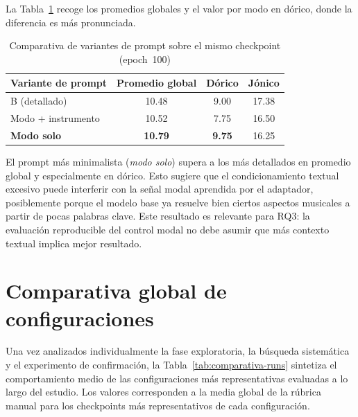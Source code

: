 \documentclass[%
    school=etsisi,%
    type=pfg,%
    degree=61CD,%
]{upm-report}
\begin{document}
La Tabla~\ref{tab:ablacion-prompts} recoge los promedios globales y el valor por modo en d\'orico, donde la diferencia es m\'as pronunciada.

\begin{table}[htbp]
    \centering
    \caption{Comparativa de variantes de prompt sobre el mismo checkpoint (epoch~100)}
    \label{tab:ablacion-prompts}
    \begin{tabular}{lccc}
        \toprule
        \textbf{Variante de prompt} & \textbf{Promedio global} & \textbf{D\'orico} & \textbf{J\'onico} \\
        \midrule
        B (detallado)         & 10.48 & 9.00  & 17.38 \\
        Modo + instrumento    & 10.52 & 7.75  & 16.50 \\
        \textbf{Modo solo}    & \textbf{10.79} & \textbf{9.75} & 16.25 \\
        \bottomrule
    \end{tabular}
\end{table}

El prompt m\'as minimalista (\textit{modo solo}) supera a los m\'as detallados en promedio global y especialmente en d\'orico. Esto sugiere que el condicionamiento textual excesivo puede interferir con la se\~nal modal aprendida por el adaptador, posiblemente porque el modelo base ya resuelve bien ciertos aspectos musicales a partir de pocas palabras clave. Este resultado es relevante para RQ3: la evaluaci\'on reproducible del control modal no debe asumir que m\'as contexto textual implica mejor resultado.

\section{Comparativa global de configuraciones}
\label{s:comparativa-global}

Una vez analizados individualmente la fase exploratoria, la b\'usqueda sistem\'atica y el experimento de confirmaci\'on, la Tabla~\ref{tab:comparativa-runs} sintetiza el comportamiento medio de las configuraciones m\'as representativas evaluadas a lo largo del estudio. Los valores corresponden a la media global de la r\'ubrica manual para los checkpoints m\'as representativos de cada configuraci\'on.
\end{document}
